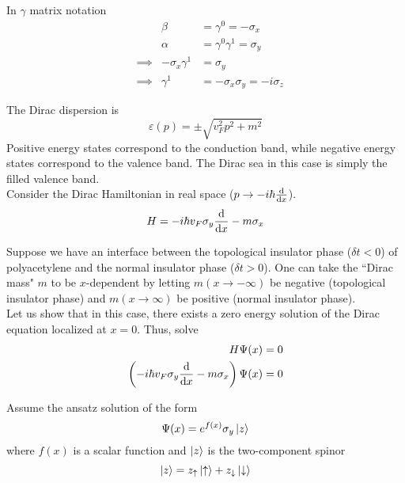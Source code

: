 \documentclass[12pt,a4paper,titlepage]{article}
\newcommand{\up}{\uparrow} %
\newcommand{\dn}{\downarrow} %
\begin{document}
In $\gamma$ matrix notation
\begin{equation}
\begin{aligned}
& &\beta&=\gamma^{0}=-\sigma_{x}\\
& &\alpha&=\gamma^{0}\gamma^{1}=\sigma_{y}\\
&\implies &-\sigma_{x}\gamma^{1}&=\sigma_{y}\\
&\implies &\gamma^{1}&=-\sigma_{x}\sigma_{y}=-i\sigma_{z}
\end{aligned}
\end{equation}

The Dirac dispersion is
\begin{equation}
\varepsilon(p)=\pm\sqrt{v_{F}^{2}p^{2}+m^{2}}
\end{equation}
Positive energy states correspond to the conduction band, while negative energy states correspond to the valence band. The Dirac sea in this case is simply the filled valence band.\\

Consider the Dirac Hamiltonian in real space ($p\rightarrow -i\hbar\dv{x}$).
\begin{equation}
H=-i\hbar v_{F}\sigma_{y}\dv{x}-m\sigma_{x}
\end{equation}

Suppose we have an interface between the topological insulator phase ($\delta t<0$) of polyacetylene and the normal insulator phase ($\delta t>0$). One can take the ``Dirac mass" $m$ to be $x$-dependent by letting $m(x\rightarrow-\infty)$ be negative (topological insulator phase) and $m(x\rightarrow\infty)$ be positive (normal insulator phase).\\

Let us show that in this case, there exists a zero energy solution of the Dirac equation localized at $x=0$. Thus, solve
\begin{equation}
\begin{aligned}
H\Psi(x)&=0\\
\left(-i\hbar v_{F}\sigma_{y}\dv{x}-m\sigma_{x}\right)\Psi(x)&=0
\end{aligned}
\end{equation}
 
Assume the ansatz solution of the form
\begin{equation}
\Psi(x)=e^{f(x)}\sigma_{y}\ket{z}
\end{equation}
where $f(x)$ is a scalar function and $\ket{z}$ is the two-component spinor
\begin{equation}
\ket{z}=z_{\up}\ket{\up}+z_{\dn}\ket{\dn}
\end{equation}
\end{document}
